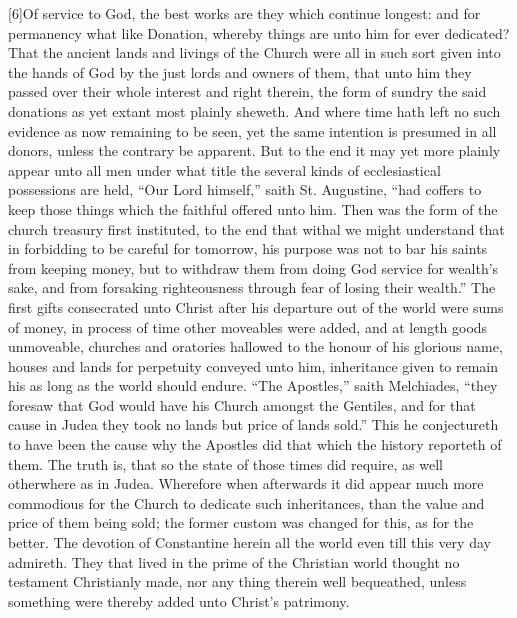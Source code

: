 [6]Of service to God, the best works are they which continue longest: and for permanency what like Donation, whereby things are unto him for ever dedicated? That the  ancient lands and livings of the Church were all in such sort given into the hands of God by the just lords and owners of them, that unto him they passed over their whole interest and right therein, the form of sundry the said donations as yet extant most plainly sheweth. And where time hath left no such evidence as now remaining to be seen, yet the same intention is presumed in all donors, unless the contrary be apparent. But to the end it may yet more plainly appear unto all men under what title the several kinds of ecclesiastical possessions are held, “Our Lord himself,” saith St. Augustine, “had coffers to keep those things which the faithful offered unto him. Then was the form of the church treasury first instituted, to the end that withal we might understand that in forbidding to be careful for tomorrow, his purpose was not to bar his saints from keeping money, but to withdraw them from doing God service for wealth’s sake, and from forsaking righteousness through fear of losing their wealth.” The first gifts consecrated unto Christ after his departure out of the world were sums of money, in process of time other moveables were added, and at length goods unmoveable, churches and oratories hallowed to the honour of his glorious name, houses and lands for perpetuity conveyed unto him, inheritance given to remain his as long as the world should endure. “The Apostles,” saith Melchiades, “they foresaw that God would have his Church amongst the Gentiles, and for that cause in Judea they took no lands but price of lands sold.”  This he conjectureth to have been the cause why the Apostles did that which the history reporteth of them. The truth is, that so the state of those times did require, as well otherwhere as in Judea. Wherefore when afterwards it did appear much more commodious for the Church to dedicate such inheritances, than the value and price of them being sold; the former custom was changed for this, as for the better. The devotion of Constantine herein all the world even till this very day admireth. They that lived in the prime of the Christian world thought no testament Christianly made, nor any thing therein well bequeathed, unless something were thereby added unto Christ’s patrimony.

